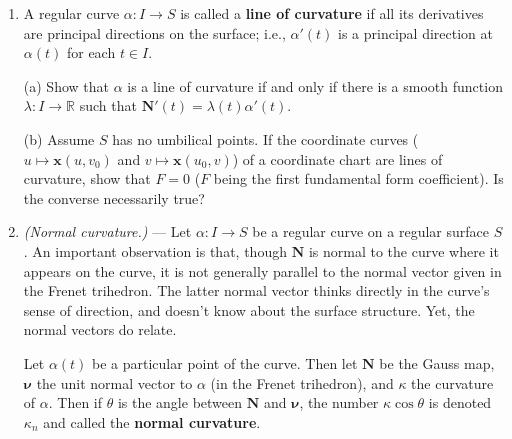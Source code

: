 \documentclass[leqno]{book}
\begin{document}
\begin{enumerate}
(a) A point is umbilical if and only if all its directions are principal directions.

(b) If a point is umbilical, then all of its principal curvatures are equal.  Explain why this is false for arbitrary points on regular surfaces.

(c) Directions $\vec v,\vec w\in T_pS$ are said to be \textbf{conjugate} if $d\mathbf N_p(\vec v)\cdot\vec w=0$.  Since $d\mathbf N_p$ is self-adjoint, this is a symmetric relation on directions.  For the sphere, plane and cylinder, give explicit descriptions of conjugate directions.  Use this to show that conjugate directions need \emph{not} be preserved by local isometries.

(d) A direction $\vec v\in T_pS$ is said to be \textbf{asymptotic} if it is conjugate to itself; i.e., $d\mathbf N_p(\vec v)\cdot\vec v=0$.  Show that such directions exist at $p$ if and only if $p$ is not elliptic.

\item A regular curve $\alpha:I\to S$ is called a \textbf{line of curvature} if all its derivatives are principal directions on the surface; i.e., $\alpha'(t)$ is a principal direction at $\alpha(t)$ for each $t\in I$.

(a) Show that $\alpha$ is a line of curvature if and only if there is a smooth function $\lambda:I\to\mathbb R$ such that $\mathbf N'(t)=\lambda(t)\alpha'(t)$.

(b) Assume $S$ has no umbilical points.  If the coordinate curves ($u\mapsto\mathbf x(u,v_0)$ and $v\mapsto\mathbf x(u_0,v)$) of a coordinate chart are lines of curvature, show that $F=0$ ($F$ being the first fundamental form coefficient).  Is the converse necessarily true? %

\item\emph{(Normal curvature.)} \---- Let $\alpha:I\to S$ be a regular curve on a regular surface $S$.  An important observation is that, though $\mathbf N$ is normal to the curve where it appears on the curve, it is not generally parallel to the normal vector given in the Frenet trihedron.  The latter normal vector thinks directly in the curve's sense of direction, and doesn't know about the surface structure.  Yet, the normal vectors do relate.

Let $\alpha(t)$ be a particular point of the curve.  Then let $\mathbf N$ be the Gauss map, $\boldsymbol\nu$ the unit normal vector to $\alpha$ (in the Frenet trihedron), and $\kappa$ the curvature of $\alpha$.  Then if $\theta$ is the angle between $\mathbf N$ and $\boldsymbol\nu$, the number $\kappa\cos\theta$ is denoted $\kappa_n$ and called the \textbf{normal curvature}.


\end{enumerate}
\end{document}
